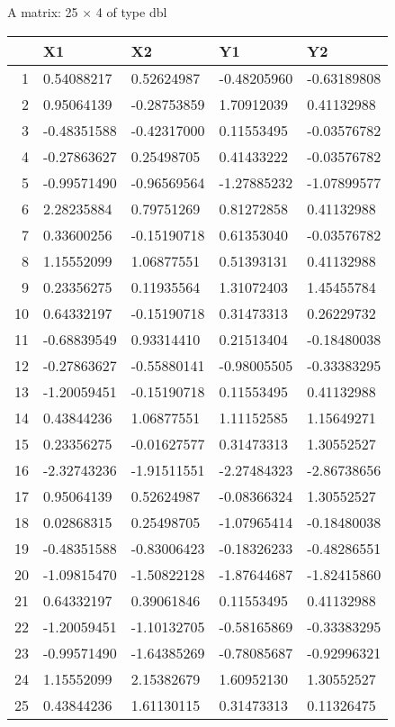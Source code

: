 \documentclass[11pt]{article}
\begin{document}
    A matrix: 25 × 4 of type dbl
\begin{tabular}{r|llll}
  & X1 & X2 & Y1 & Y2\\
\hline
	1 &  0.54088217 &  0.52624987 & -0.48205960 & -0.63189808\\
	2 &  0.95064139 & -0.28753859 &  1.70912039 &  0.41132988\\
	3 & -0.48351588 & -0.42317000 &  0.11553495 & -0.03576782\\
	4 & -0.27863627 &  0.25498705 &  0.41433222 & -0.03576782\\
	5 & -0.99571490 & -0.96569564 & -1.27885232 & -1.07899577\\
	6 &  2.28235884 &  0.79751269 &  0.81272858 &  0.41132988\\
	7 &  0.33600256 & -0.15190718 &  0.61353040 & -0.03576782\\
	8 &  1.15552099 &  1.06877551 &  0.51393131 &  0.41132988\\
	9 &  0.23356275 &  0.11935564 &  1.31072403 &  1.45455784\\
	10 &  0.64332197 & -0.15190718 &  0.31473313 &  0.26229732\\
	11 & -0.68839549 &  0.93314410 &  0.21513404 & -0.18480038\\
	12 & -0.27863627 & -0.55880141 & -0.98005505 & -0.33383295\\
	13 & -1.20059451 & -0.15190718 &  0.11553495 &  0.41132988\\
	14 &  0.43844236 &  1.06877551 &  1.11152585 &  1.15649271\\
	15 &  0.23356275 & -0.01627577 &  0.31473313 &  1.30552527\\
	16 & -2.32743236 & -1.91511551 & -2.27484323 & -2.86738656\\
	17 &  0.95064139 &  0.52624987 & -0.08366324 &  1.30552527\\
	18 &  0.02868315 &  0.25498705 & -1.07965414 & -0.18480038\\
	19 & -0.48351588 & -0.83006423 & -0.18326233 & -0.48286551\\
	20 & -1.09815470 & -1.50822128 & -1.87644687 & -1.82415860\\
	21 &  0.64332197 &  0.39061846 &  0.11553495 &  0.41132988\\
	22 & -1.20059451 & -1.10132705 & -0.58165869 & -0.33383295\\
	23 & -0.99571490 & -1.64385269 & -0.78085687 & -0.92996321\\
	24 &  1.15552099 &  2.15382679 &  1.60952130 &  1.30552527\\
	25 &  0.43844236 &  1.61130115 &  0.31473313 &  0.11326475\\
\end{tabular}
\end{document}
